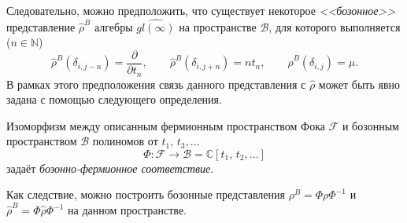 \documentclass[a4paper,14pt]{extarticle}
\numberwithin{equation}{section}
\begin{document}
Следовательно, можно предположить, что существует некоторое \emph{<<бозонное>>} представление $\hat{\rho}^B$ алгебры $\widehat{gl(\infty)}$ на  пространстве $\mathcal{B}$, для которого
выполняется ($n \in \mathbb{N}$)
\[
\hat{\rho}^B\left( \delta_{i,j-n} \right) =\frac{\partial }{\partial t_n} ,\qquad \hat{\rho}^B\left( \delta_{i,j+n} \right) =nt_n,\qquad \hat{\rho}^B\left( \delta_{i,j} \right) =\mu
.\] 
В рамках этого предположения связь данного представления с $\hat{\rho}$ может быть явно задана
с помощью следующего определения.
\begin{dfn*}
Изоморфизм между описанным
фермионным пространством Фока $\mathcal{F}$ и бозонным пространством $\mathcal{B}$ полиномов
от $t_1,\,t_3,\ldots$
\begin{equation}
	\Phi: \mathcal{F}\to \mathcal{B}= \mathbb{C}\left[ t_1,\,t_2,\ldots
\right] 
\end{equation} 
задаёт \emph{бозонно-фермионное соответствие}.
\end{dfn*} Как следствие, можно построить бозонные представления
$\rho^B=\Phi \rho \Phi^{-1}$ и $\hat{\rho}^B= \Phi \hat{\rho} \Phi^{-1}$ на данном пространстве.

\end{document}

